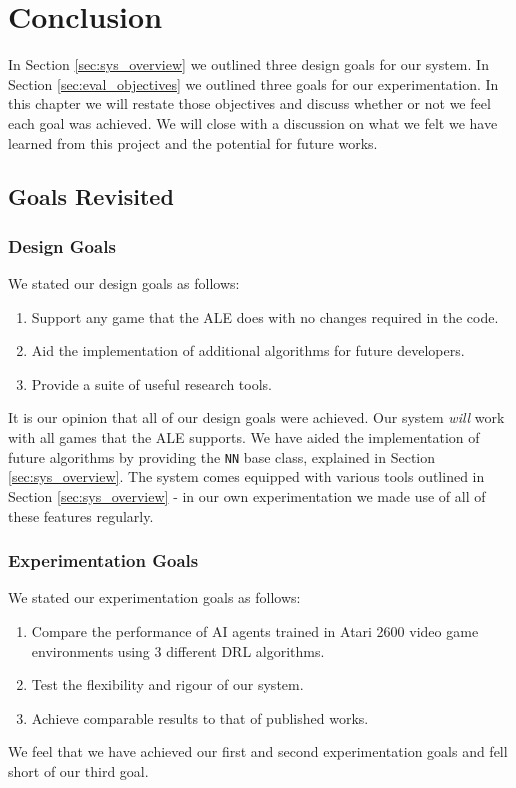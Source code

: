 \chapter{Conclusion}
In Section \ref{sec:sys_overview} we outlined three design goals for our system. In Section \ref{sec:eval_objectives} we outlined three goals for our experimentation. In this chapter we will restate those objectives and discuss whether or not we feel each goal was achieved. We will close with a discussion on what we felt we have learned from this project and the potential for future works.
\section{Goals Revisited}
\subsection{Design Goals}
We stated our design goals as follows:
\begin{enumerate}
	\item Support any game that the ALE does with no changes required in the code.
	\item Aid the implementation of additional algorithms for future developers.
	\item Provide a suite of useful research tools.
\end{enumerate}
It is our opinion that all of our design goals were achieved. Our system \textit{will} work with all games that the ALE supports. We have aided the implementation of future algorithms by providing the \texttt{NN} base class, explained in Section \ref{sec:sys_overview}. The system comes equipped with various tools outlined in Section \ref{sec:sys_overview} - in our own experimentation we made use of all of these features regularly.

\subsection{Experimentation Goals}
We stated our experimentation goals as follows:
\begin{enumerate}
	\item Compare the performance of AI agents trained in Atari 2600 video game environments using 3 different DRL algorithms.
	\item Test the flexibility and rigour of our system.
	\item Achieve comparable results to that of published works.
\end{enumerate}
We feel that we have achieved our first and second experimentation goals and fell short of our third goal. \paragraph{}

